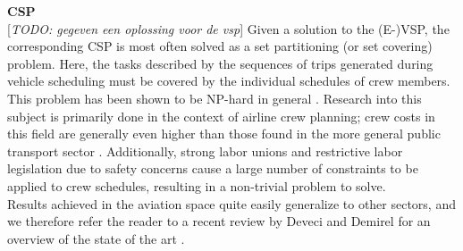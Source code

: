 \documentclass[]{book}
\newcommand{\todo}[1]{{\color{red}[\textit{TODO: #1}]}}
\begin{document}
\noindent \textbf{CSP}\\
\todo{gegeven een oplossing voor de vsp}
Given a solution to the (E-)VSP, the corresponding CSP is most often solved as a set partitioning (or set covering) problem. Here, the tasks described by the sequences of trips generated during vehicle scheduling must be covered by the individual schedules of crew members. This problem has been shown to be NP-hard in general \cite{Fischetti1989}. Research into this subject is primarily done in the context of airline crew planning; crew costs in this field are generally even higher than those found in the more general public transport sector \cite{Barnhart2003}. Additionally, strong labor unions and restrictive labor legislation due to safety concerns cause a large number of constraints to be applied to crew schedules, resulting in a non-trivial problem to solve. \\
Results achieved in the aviation space quite easily generalize to other sectors, and we therefore refer the reader to a recent review by Deveci and Demirel for an overview of the state of the art \cite{Deveci2018}. \\\\
\end{document}
